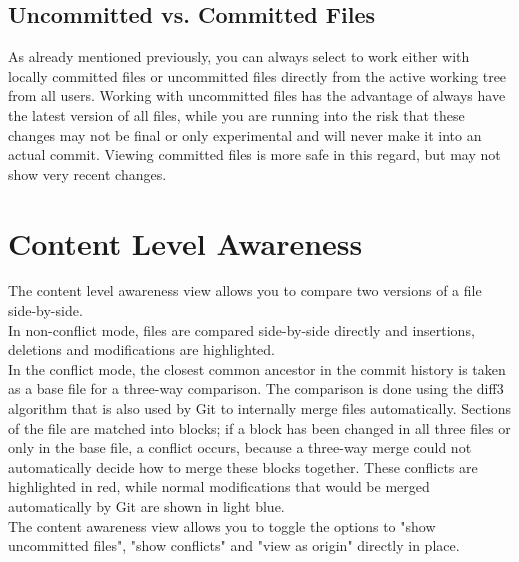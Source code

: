 \subsection{Uncommitted vs. Committed Files}

As already mentioned previously, you can always select to work either with locally committed files or uncommitted files directly from the active working tree from all users. Working with uncommitted files has the advantage of always have the latest version of all files, while you are running into the risk that these changes may not be final or only experimental and will never make it into an actual commit. Viewing committed files is more safe in this regard, but may not show very recent changes.







\section{Content Level Awareness}




The content level awareness view allows you to compare two versions of a file side-by-side. \\

In non-conflict mode, files are compared side-by-side directly and insertions, deletions and modifications are highlighted. \\

In the conflict mode, the closest common ancestor in the commit history is taken as a base file for a three-way comparison. The comparison is done using the diff3 algorithm that is also used by Git to internally merge files automatically. Sections of the file are matched into blocks; if a block has been changed in all three files or only in the base file, a conflict occurs, because a three-way merge could not automatically decide how to merge these blocks together. These conflicts are highlighted in red, while normal modifications that would be merged automatically by Git are shown in light blue. \\

The content awareness view allows you to toggle the options to "show uncommitted files", "show conflicts" and "view as origin" directly in place.







